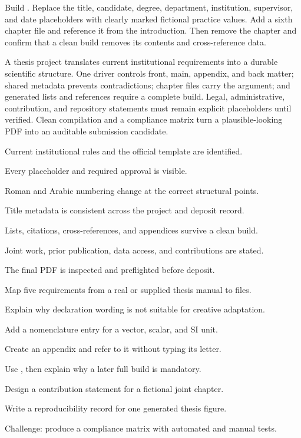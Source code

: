 \chapterproject

\begin{miniproject}
Build . Replace the title, candidate, degree,
department, institution, supervisor, and date placeholders with clearly marked
fictional practice values. Add a sixth chapter file and reference it from the
introduction. Then remove the chapter and confirm that a clean build removes
its contents and cross-reference data.
\end{miniproject}

\chaptersummary

A thesis project translates current institutional requirements into a durable
scientific structure. One driver controls front, main, appendix, and back
matter; shared metadata prevents contradictions; chapter files carry the
argument; and generated lists and references require a complete build. Legal,
administrative, contribution, and repository statements must remain explicit
placeholders until verified. Clean compilation and a compliance matrix turn a
plausible-looking PDF into an auditable submission candidate.

\chaptercheck
\begin{chapterchecklist}
  \item Current institutional rules and the official template are identified.
  \item Every placeholder and required approval is visible.
  \item Roman and Arabic numbering change at the correct structural points.
  \item Title metadata is consistent across the project and deposit record.
  \item Lists, citations, cross-references, and appendices survive a clean build.
  \item Joint work, prior publication, data access, and contributions are stated.
  \item The final PDF is inspected and preflighted before deposit.
\end{chapterchecklist}

\chapterexercisestitle
\begin{chapterexercises}
  \item Map five requirements from a real or supplied thesis manual to files.
  \item Explain why declaration wording is not suitable for creative adaptation.
  \item Add a nomenclature entry for a vector, scalar, and SI unit.
  \item Create an appendix and refer to it without typing its letter.
  \item Use , then explain why a later full build is mandatory.
  \item Design a contribution statement for a fictional joint chapter.
  \item Write a reproducibility record for one generated thesis figure.
  \item Challenge: produce a compliance matrix with automated and manual tests.
\end{chapterexercises}
